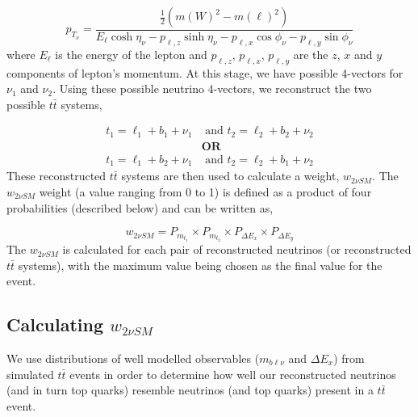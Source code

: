 \begin{equation}
    p_{{T}_{\nu}} = \frac{\frac{1}{2} (m(W)^{2} - m(\ell)^{2})}{E_{\ell}\cosh{\eta_{\nu}} - p_{\ell,z}\sinh{\eta_{\nu}} - p_{\ell,x}\cos{\phi_{\nu}} - p_{\ell,y}\sin{\phi_{\nu}} }
\end{equation}
where $E_{\ell}$ is the energy of the lepton and $p_{\ell, z}$, $p_{\ell, x}$, $p_{\ell, y}$ are the $z$, $x$ and $y$ components of lepton's momentum. At this stage, we have possible 4-vectors for $\nu_{1}$ and $\nu_{2}$. Using these possible neutrino 4-vectors, we reconstruct the two possible $t\bar{t}$ systems,

\begin{align}
    t_{1} = \ell_{1} + b_{1} + \nu_{1} &\text{ and } t_{2} = \ell_{2} + b_{2} + \nu_{2} \label{eq:top1-2vSM}\\
    &\textbf{OR}\nonumber\\ 
     t_{1} = \ell_{1} + b_{2} + \nu_{1} &\text{ and } t_{2} = \ell_{2} + b_{1} + \nu_{2} \label{eq:top2-2vSM}
\end{align}
These reconstructed $t\bar{t}$ systems are then used to calculate a weight, $w_{2\nu SM}$. The $w_{2\nu SM}$ weight (a value ranging from 0 to 1) is defined as a product of four probabilities (described below) and can be written as,

\begin{equation}
    w_{2\nu SM} = P_{m_{t_{1}}} \times P_{m_{t_{2}}} \times P_{\Delta E_{x}} \times P_{\Delta E_{y}}
\end{equation}
The $w_{2\nu SM}$ is calculated for each pair of reconstructed neutrinos (or reconstructed $t\bar{t}$ systems), with the maximum value being chosen as the final value for the event.

\subsection{Calculating $w_{2\nu SM}$}
We use distributions of well modelled observables ($m_{b\ell\nu}$ and $\Delta E_{x}$) from simulated $t\bar{t}$ events in order to determine how well our reconstructed neutrinos (and in turn top quarks) resemble neutrinos (and top quarks) present in a $t\bar{t}$ event.
